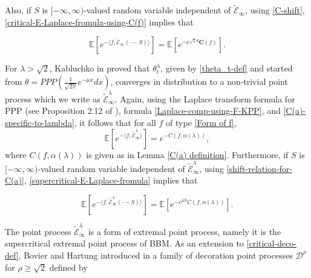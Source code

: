 \documentclass[a4paper,reqno]{amsart}%
\newcommand{\Cb}{\mathbf{C}}
\newcommand{\1}{\mathbf 1}
\theoremstyle{mine}
\numberwithin{theorem}{section}
\numberwithin{equation}{section}
\theoremstyle{remark}
\begin{document}
Also, if $S$ is $[-\infty, \infty)$-valued random variable independent of $\widetilde{\mathcal E}_\infty $, using \eqref{C-shift},  \eqref{critical-E-Laplace-fromula-using-C(f)} implies that 

\begin{equation}\label{critical-E-Laplace-fromula-with-shift}
    \mathbb{E}[e^{-\langle f, \widetilde{\mathcal E}_\infty(\cdot -S)  \rangle}] = \mathbb{E}[e^{- e^{\sqrt{2} S}\Cb(f)}].
\end{equation}

\vspace{3mm}

For $\lambda > \sqrt{2}$, Kabluchko in \cite{Kabluchko} proved that $\theta_t^\lambda$, given by \eqref{theta_t-def} and started from 
$\theta = PPP(\frac{1}{\sqrt{2\pi}}e^{-\mu x } dx)$, converges in distribution to a non-trivial point process which we write as $\widetilde{\mathcal E}_\infty^\lambda$. 
Again, using the Laplace transform formula for PPP (see Proposition 2.12 of \cite{Bovier_book}), formula \eqref{Laplace-comp-using-F-KPP}, and \eqref{C(a)-specific-to-lambda}, it follows that for all $f$ of type \eqref{Form of f}, 
\begin{equation}\label{supercritical-E-Laplace-fromula}
\mathbb{E}[e^{-\langle f, \widetilde{\mathcal E}_\infty^\lambda  \rangle}] = e^{-C(f, \alpha(\lambda))}, 
\end{equation}
where $C(f, \alpha(\lambda))$ is given as in Lemma \ref{C(a) definition}. Furthermore, if $S$ is $[-\infty, \infty)$-valued random variable independent of $\widetilde{\mathcal E}_\infty^\lambda $, using \eqref{shift-relation-for-C(a)},  \eqref{supercritical-E-Laplace-fromula} implies that 

\begin{equation}\label{supercritical-E-Laplace-fromula-with-shift}
    \mathbb{E}[e^{-\langle f, \widetilde{\mathcal E}_\infty^\lambda(\cdot -S)  \rangle}] = \mathbb{E}[e^{- e^{\mu S}C(f, \alpha(\lambda))}].
\end{equation}

\vspace{5mm}


The point process $\widetilde{\mathcal E}_\infty^\lambda$ is a form of extremal point process, namely it is the supercritical extremal point process of BBM. As an extension to \eqref{critical-deco-def}, Bovier and Hartung introduced in \cite{bovier2014extremal} a family of decoration point processes $\mathcal{D}^\rho$ for $\rho \geq \sqrt{2}$ defined by 
\end{document}
